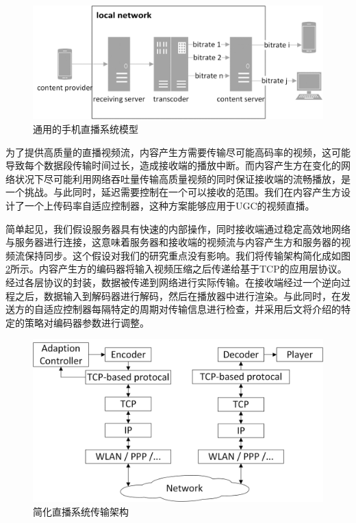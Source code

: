 \begin{figure}[h]
	\centering
	\includegraphics[width = 1.0\linewidth]{clip/07.png}
	\caption{通用的手机直播系统模型\label{fig:07}}
\end{figure}

为了提供高质量的直播视频流，内容产生方需要传输尽可能高码率的视频，这可能导致每个数据段传输时间过长，造成接收端的播放中断。而内容产生方在变化的网络状况下尽可能利用网络吞吐量传输高质量视频的同时保证接收端的流畅播放，是一个挑战。与此同时，延迟需要控制在一个可以接收的范围。我们在内容产生方设计了一个上传码率自适应控制器，这种方案能够应用于UGC的视频直播。

简单起见，我们假设服务器具有快速的内部操作，同时接收端通过稳定高效地网络与服务器进行连接，这意味着服务器和接收端的视频流与内容产生方和服务器的视频流保持同步。这个假设对我们的研究重点没有影响。我们将传输架构简化成如图\ref{fig:08}所示。内容产生方的编码器将输入视频压缩之后传递给基于TCP的应用层协议。经过各层协议的封装，数据被传递到网络进行实际传输。在接收端经过一个逆向过程之后，数据输入到解码器进行解码，然后在播放器中进行渲染。与此同时，在发送方的自适应控制器每隔特定的周期对传输信息进行检查，并采用后文将介绍的特定的策略对编码器参数进行调整。

\begin{figure}[h]
	\centering
	\includegraphics[width = 1.0\linewidth]{clip/08.png}
	\caption{简化直播系统传输架构\label{fig:08}}
\end{figure}

